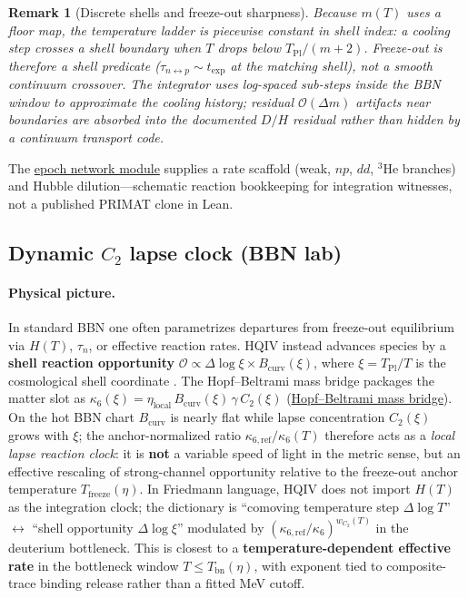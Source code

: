 \documentclass[11pt]{amsart}
\newtheorem{remark}[theorem]{Remark}
\begin{document}
\begin{remark}[Discrete shells and freeze-out sharpness]
Because $m(T)$ uses a floor map, the temperature ladder is piecewise constant
in shell index: a cooling step crosses a shell boundary when $T$ drops below
$T_{\mathrm{Pl}}/(m+2)$.  Freeze-out is therefore a \emph{shell predicate}
($\tau_{n\!\leftrightarrow\! p}\sim t_{\mathrm{exp}}$ at the matching shell),
not a smooth continuum crossover.  The integrator uses log-spaced sub-steps
inside the BBN window to approximate the cooling history; residual
$\mathcal{O}(\Delta m)$ artifacts near boundaries are absorbed into the
documented $D/H$ residual rather than hidden by a continuum transport code.
\end{remark}

The \hyperref[lean:bbn-epoch-network]{epoch network module} supplies a
rate scaffold (weak, $np$, $dd$, $^3\mathrm{He}$ branches) and Hubble
dilution---schematic reaction bookkeeping for integration witnesses, not a
published PRIMAT clone in Lean.

\subsection{Dynamic $C_2$ lapse clock (BBN lab)}
\label{sec:dynamic-c2}

\paragraph{Physical picture.}
In standard BBN one often parametrizes departures from freeze-out equilibrium
via $H(T)$, $\tau_n$, or effective reaction rates.  HQIV instead advances
species by a \textbf{shell reaction opportunity}
$\mathcal{O}\propto \Delta\log\xi\times B_{\mathrm{curv}}(\xi)$, where
$\xi=T_{\mathrm{Pl}}/T$ is the cosmological shell coordinate
\cite{hqiv-baryogenesis-paper}.  The Hopf--Beltrami mass bridge packages the
matter slot as $\kappa_6(\xi)=\eta_{\mathrm{local}}\,B_{\mathrm{curv}}(\xi)\,
\gamma\,C_2(\xi)$ (\hyperref[lean:bbn-dynamic-c2]{Hopf--Beltrami mass bridge}).
On the hot BBN chart $B_{\mathrm{curv}}$ is nearly flat while lapse
concentration $C_2(\xi)$ grows with $\xi$; the anchor-normalized ratio
$\kappa_{6,\mathrm{ref}}/\kappa_6(T)$ therefore acts as a \emph{local lapse
reaction clock}: it is \textbf{not} a variable speed of light in the metric
sense, but an effective rescaling of strong-channel opportunity relative to the
freeze-out anchor temperature $T_{\mathrm{freeze}}(\eta)$.  In Friedmann
language, HQIV does not import $H(T)$ as the integration clock; the
dictionary is ``comoving temperature step $\Delta\log T$'' $\leftrightarrow$
``shell opportunity $\Delta\log\xi$'' modulated by $(\kappa_{6,\mathrm{ref}}/
\kappa_6)^{w_{C_2}(T)}$ in the deuterium bottleneck.  This is closest to a
\textbf{temperature-dependent effective rate} in the bottleneck window
$T\le T_{\mathrm{bn}}(\eta)$, with exponent tied to composite-trace binding
release rather than a fitted MeV cutoff.
\end{document}

